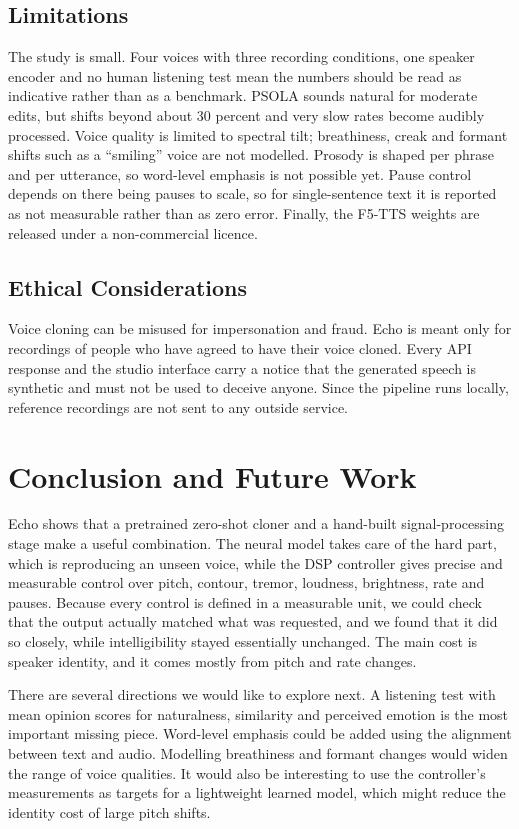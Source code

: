 \documentclass[conference]{IEEEtran}
\begin{document}
\subsection{Limitations}
The study is small. Four voices with three recording conditions, one speaker encoder and no human
listening test mean the numbers should be read as indicative rather than as a benchmark.
PSOLA sounds natural for moderate edits, but shifts beyond about 30 percent and very slow rates
become audibly processed. Voice quality is limited to spectral tilt; breathiness, creak and formant
shifts such as a ``smiling'' voice are not modelled. Prosody is shaped per phrase and per utterance,
so word-level emphasis is not possible yet. Pause control depends on there being pauses to scale,
so for single-sentence text it is reported as not measurable rather than as zero error. Finally,
the F5-TTS weights are released under a non-commercial licence.

\subsection{Ethical Considerations}
Voice cloning can be misused for impersonation and fraud. Echo is meant only for recordings of
people who have agreed to have their voice cloned. Every API response and the studio interface carry
a notice that the generated speech is synthetic and must not be used to deceive anyone. Since the
pipeline runs locally, reference recordings are not sent to any outside service.

\section{Conclusion and Future Work}
Echo shows that a pretrained zero-shot cloner and a hand-built signal-processing stage make a
useful combination. The neural model takes care of the hard part, which is reproducing an unseen
voice, while the DSP controller gives precise and measurable control over pitch, contour, tremor,
loudness, brightness, rate and pauses. Because every control is defined in a measurable unit, we
could check that the output actually matched what was requested, and we found that it did so
closely, while intelligibility stayed essentially unchanged. The main cost is speaker identity, and
it comes mostly from pitch and rate changes.

There are several directions we would like to explore next. A listening test with mean opinion
scores for naturalness, similarity and perceived emotion is the most important missing piece.
Word-level emphasis could be added using the alignment between text and audio. Modelling
breathiness and formant changes would widen the range of voice qualities. It would also be
interesting to use the controller's measurements as targets for a lightweight learned model, which
might reduce the identity cost of large pitch shifts.
\end{document}
